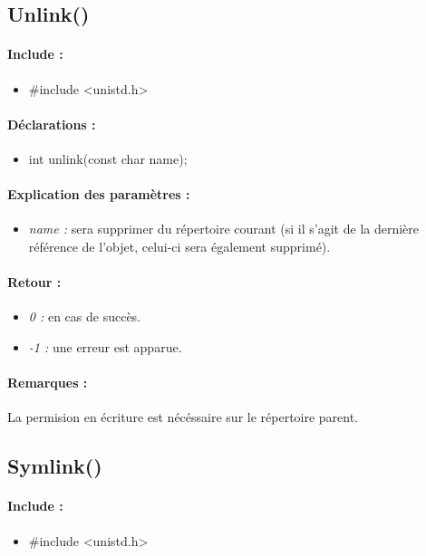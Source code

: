 \documentclass{article}[12pt]
\begin{document}
\subsection{Unlink()}
\paragraph{Include : }
\begin{itemize}
	\item \#include <unistd.h>
\end{itemize}
\paragraph{Déclarations : }
\begin{itemize}
	\item int unlink(const char \* name);
\end{itemize}
\paragraph{Explication des paramètres : }
\begin{itemize}
	\item \emph{name : } sera supprimer du répertoire courant (si il s'agit de la dernière référence de l'objet, celui-ci sera également supprimé).
\end{itemize}
\paragraph{Retour : }
\begin{itemize}
	\item \emph{0 : } en cas de succès.
	\item \emph{-1 : } une erreur est apparue.
\end{itemize}
\paragraph{Remarques : }
La permision en écriture est nécéssaire sur le répertoire parent. 
\subsection{Symlink()}
\paragraph{Include : }
\begin{itemize}
	\item \#include <unistd.h>
\end{itemize}
\end{document}
